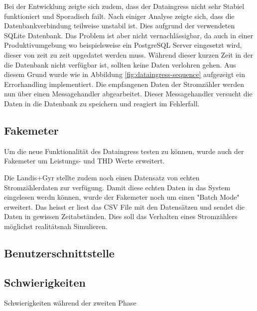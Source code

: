 Bei der Entwicklung zeigte sich zudem, dass der Dataingress nicht sehr Stabiel
funktioniert und Sporadisch failt. Nach einiger Analyse zeigte sich, dass
die Datenbankverbindung teilweise unstabil ist. Dies aufgrund der verwendeten
SQLite Datenbank. Das Problem ist aber nicht vernachlässigbar, da auch in einer
Produktivumgebung wo beispielsweise ein PostgreSQL Server eingesetzt wird,
dieser von zeit zu zeit upgedatet werden muss.
Während dieser kurzen Zeit in der die Datenbank nicht verfügbar ist, sollten keine
Daten verlohren gehen.
Aus diesem Grund wurde wie in Abbildung \ref{fig:dataingress-sequence} aufgezeigt
ein Errorhandling implementiert. Die empfangenen Daten der Stromzähler
werden nun über einen Messagehandler abgearbeitet.
Dieser Messagehandler versucht die Daten in die Datenbank zu speichern und
reagiert im Fehlerfall.

\subsection{Fakemeter}

Um die neue Funktionalität des Dataingress testen zu können, wurde auch der
Fakemeter um Leistungs- und THD Werte erweitert.

Die Landis+Gyr stellte zudem noch einen Datensatz von echten Stromzählerdaten
zur verfügung. Damit diese echten Daten in das System eingelesen werdn können,
wurde der Fakemeter noch um einen "Batch Mode" erweitert. Das heisst
er liest das CSV File mit den Datensätzen und sendet die Daten in
gewissen Zeitabständen. Dies soll das Verhalten eines Stromzählers
möglichst realitätsnah Simulieren.

\subsection{Benutzerschnittstelle}

\subsection{Schwierigkeiten}
Schwierigkeiten während der zweiten Phase
